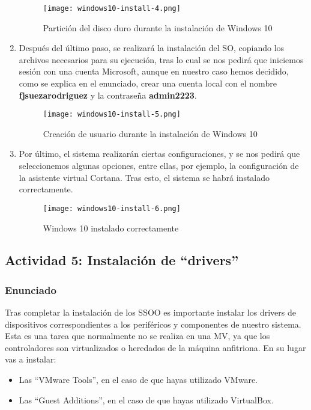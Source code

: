 \begin{enumerate}
    \begin{figure}[H]
        \centering
        \texttt{[image: windows10-install-4.png]}
        \caption{Partición del disco duro durante la instalación de Windows 10}
    \end{figure}

    \item Después del último paso, se realizará la instalación del SO, copiando los archivos necesarios para su ejecución, tras lo cual se nos pedirá que iniciemos sesión con una cuenta Microsoft, aunque en nuestro caso hemos decidido, como se explica en el enunciado, crear una cuenta local con el nombre \textbf{fjsuezarodriguez} y la contraseña \textbf{admin2223}.

    \begin{figure}[H]
        \centering
        \texttt{[image: windows10-install-5.png]}
        \caption{Creación de usuario durante la instalación de Windows 10}
    \end{figure}

    \item Por último, el sistema realizarán ciertas configuraciones, y se nos pedirá que seleccionemos algunas opciones, entre ellas, por ejemplo, la configuración de la asistente virtual Cortana. Tras esto, el sistema se habrá instalado correctamente.

    \begin{figure}[H]
        \centering
        \texttt{[image: windows10-install-6.png]}
        \caption{Windows 10 instalado correctamente}
    \end{figure}
\end{enumerate}

\subsection{Actividad 5: Instalación de ``drivers''}

\subsubsection{Enunciado}
Tras completar la instalación de los SSOO es importante instalar los drivers de dispositivos correspondientes a los periféricos y componentes de nuestro sistema. Esta es una tarea que normalmente no se realiza en una MV, ya que los controladores son virtualizados o heredados de la máquina anfitriona. En su lugar vas a instalar:

\begin{itemize}
    \item Las ``VMware Tools'', en el caso de que hayas utilizado VMware.
    \item Las ``Guest Additions'', en el caso de que hayas utilizado VirtualBox.
\end{itemize}

